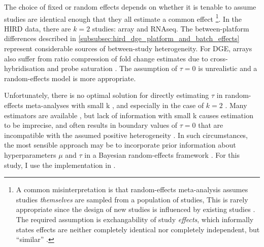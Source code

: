 The choice of fixed or random effects depends on whether it is tenable to assume studies are identical enough that they all estimate a common effect%
\footnote{
    A common misinterpretation is that random-effects meta-analysis assumes studies \emph{themselves} are sampled from a population of studies,
    This is rarely appropriate since the design of new studies is influenced by existing studies \autocite{higgins2009ReevaluationRandomeffectsMetaanalysis}.
    The required assumption is exchangability of study \emph{effects}, which informally states
    effects are neither completely identical nor completely independent, but \enquote{similar} \autocite{higgins2009ReevaluationRandomeffectsMetaanalysis}.
}.
In the \gls{HIRD} data, there are $k=2$ studies: array and \gls{RNAseq}.
The between-platform differences described in \cref{subsubsec:hird_dge_platform_and_batch_effects} represent considerable sources of between-study heterogeneity.
For \gls{DGE}, arrays also suffer from ratio compression of fold change estimates due to cross-hybridisation and probe saturation \autocite{yuen2002AccuracyCalibrationCommercial,draghici2006ReliabilityReproducibilityIssues,ma2017JointBayesianModel}.
The assumption of $\tau=0$ is unrealistic and a random-effects model is more appropriate.

Unfortunately, there is no optimal solution for directly estimating $\tau$ in random-effects meta-analyses with small k \autocite{bender2018MethodsEvidenceSynthesis}, and especially in the case of $k=2$ \autocite{gonnermann2015NoSolutionCombining}.
Many estimators are available \autocite{veroniki2016MethodsEstimateBetweenstudy}, but lack of information with small k causes estimation to be imprecise, and often results in boundary values of $\tau = 0$ that are incompatible with the assumed positive heterogeneity \autocite{chung2013NondegeneratePenalizedLikelihood,friede2017MetaanalysisFewSmall}.
In such circumstances, the most sensible approach may be to incorporate prior information about hyperparameters $\mu$ and $\tau$ in a Bayesian random-effects framework \autocite{chung2013NondegeneratePenalizedLikelihood,veroniki2016MethodsEstimateBetweenstudy,friede2017MetaanalysisFewSmall,seide2019LikelihoodbasedRandomeffectsMetaanalysis}.
For this study, I use the implementation in  \autocite{rover2017BayesianRandomeffectsMetaanalysis}.

